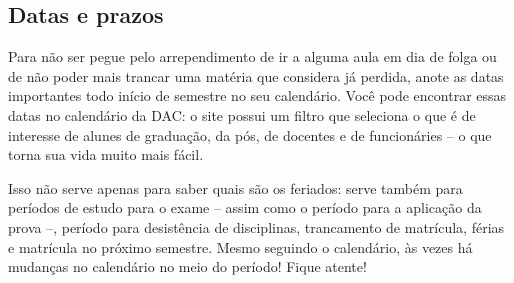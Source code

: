 \subsection{Datas e prazos}

Para não ser pegue pelo arrependimento de ir a alguma aula em dia de folga ou de não poder mais trancar uma matéria que considera já perdida, anote as datas importantes todo início de semestre no seu calendário. Você pode encontrar essas datas no calendário da DAC: o site possui um filtro que seleciona o que é de interesse de alunes de graduação, da pós, de docentes e de funcionáries – o que torna sua vida muito mais fácil.

Isso não serve apenas para saber quais são os feriados: serve também para períodos de estudo para o exame – assim como o período para a aplicação da prova –, período para desistência de disciplinas, trancamento de matrícula, férias e matrícula no próximo semestre. Mesmo seguindo o calendário, às vezes há mudanças no calendário no meio do período! Fique atente!